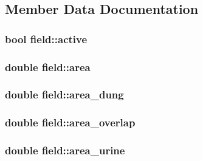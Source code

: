 \subsection{Member Data Documentation}
\hypertarget{classfield_adf9545309af5dd5c46b1059e66abe714}{
\subsubsection[{active}]{\setlength{\rightskip}{0pt plus 5cm}bool {\bf field::active}}}
\label{classfield_adf9545309af5dd5c46b1059e66abe714}
\hypertarget{classfield_a500a3007e7d5ce1b18e950abbe4c7a21}{
\subsubsection[{area}]{\setlength{\rightskip}{0pt plus 5cm}double {\bf field::area}}}
\label{classfield_a500a3007e7d5ce1b18e950abbe4c7a21}
\hypertarget{classfield_aa436f3310aeaf096dfa3a03a8fcc632a}{
\subsubsection[{area\_\-dung}]{\setlength{\rightskip}{0pt plus 5cm}double {\bf field::area\_\-dung}}}
\label{classfield_aa436f3310aeaf096dfa3a03a8fcc632a}
\hypertarget{classfield_a9c28012934fefe1cdbb10f3d680f7f87}{
\subsubsection[{area\_\-overlap}]{\setlength{\rightskip}{0pt plus 5cm}double {\bf field::area\_\-overlap}}}
\label{classfield_a9c28012934fefe1cdbb10f3d680f7f87}
\hypertarget{classfield_abd96c9e9d47349a3faaed79c4a85f894}{
\subsubsection[{area\_\-urine}]{\setlength{\rightskip}{0pt plus 5cm}double {\bf field::area\_\-urine}}}
